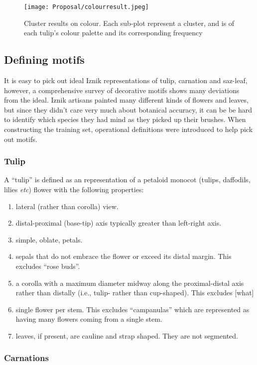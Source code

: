 \documentclass[11pt]{article}
\begin{document}
\begin{figure}[H]
\centering
\texttt{[image: Proposal/colourresult.jpeg]}
\caption{Cluster results on colour. Each sub-plot represent a cluster, and is of each tulip's colour palette and its corresponding frequency}
\label{fig:clustercolour}
\end{figure}

\subsection{Defining motifs}
\label{sec:definemotifs}
It is easy to pick out ideal Iznik representations of tulip, carnation and saz-leaf, however, a comprehensive survey of decorative motifs shows many deviations from the ideal. Iznik artisans painted many different kinds of flowers and leaves, but since they didn't care very much about botanical accuracy, it can be be hard to identify which species they had mind as they picked up their brushes. When constructing the training set, operational definitions were introduced to help pick out motifs.

\subsubsection*{Tulip}

A ``tulip'' is defined as an representation of a petaloid monocot (tulips, daffodils, lilies \emph{etc}) flower with the following properties:
\begin{enumerate}
\item lateral (rather than corolla) view.
\item distal-proximal (base-tip) axis typically greater than left-right axis.
\item simple, oblate, petals.
\item sepals that do not embrace the flower or exceed its distal margin. This excludes ``rose buds''.
\item a corolla with a maximum diameter midway along the proximal-distal axis rather than distally (i.e., tulip- rather than cup-shaped). This excludes [what] 
\item single flower per stem. This excludes ``campanulas'' which are represented as having many flowers coming from a single stem.
\item leaves, if present, are cauline and strap shaped. They are not segmented.
\end{enumerate}

\subsubsection*{Carnations}
\end{document}
